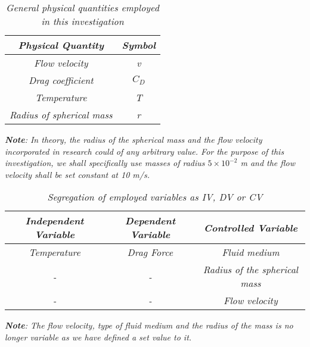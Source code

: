 \begin{table}[H]
    \centering
        \begin{tabular}{|c|c|}
        \hline
        \hline
        \textit{Physical Quantity} & \textit{Symbol} \\
        \hline
        \hline
        \textit{Flow velocity} & \textit{v} \\
        \hline
        \textit{Drag coefficient} & \textit{$C_D$} \\
		\hline        
        \textit{Temperature} & \textit{T} \\
        \hline
        \textit{Radius of spherical mass} & \textit{r} \\
        \hline
        \hline
        \end{tabular}
    \caption{\textit{General physical quantities employed in this investigation}}
\end{table}

\textit{\textbf{Note}: In theory, the radius of the spherical mass and the flow velocity  incorporated in research could of any arbitrary value. For the purpose of this investigation, we shall specifically use masses of radius $5\times10^{-2}$ m and the flow velocity shall be set constant at 10 m/s.}

\begin{table}[H]
    \centering
        \begin{tabular}{|c|c|c|}
        \hline
        \hline
        \textit{Independent Variable} & \textit{Dependent Variable} & \textit{Controlled Variable} \\
        \hline
        \hline
        \textit{Temperature} & \textit{Drag Force} & \textit{Fluid medium} \\
        \hline
        \textit{-} & \textit{-} & \textit{Radius of the spherical mass} \\
        \hline
        \textit{-} & \textit{-} & \textit{Flow velocity} \\
        \hline
        \hline
        \end{tabular}
    \caption{\textit{Segregation of employed variables as IV, DV or CV}}
\end{table}

\textit{\textbf{Note}: The flow velocity, type of fluid medium and the radius of the mass is no longer variable as we have defined a set value to it.}

